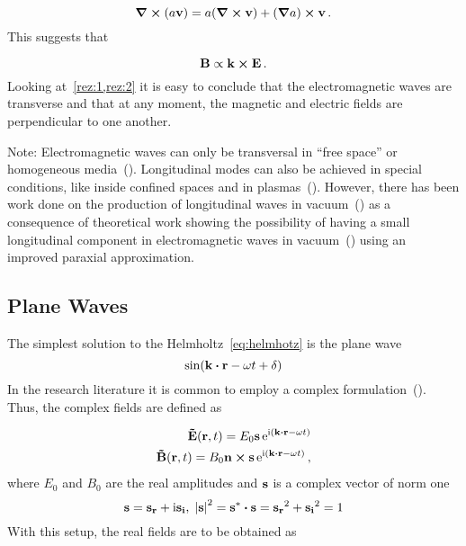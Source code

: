 \documentclass[12pt, class=report, crop=false]{standalone}
\begin{document}
\begin{equation}
  \label{id:curl-scalar*vector}
  \curl{(a\vb{v})} = a (\curl{\vb{v}}) + (\grad{a})\cp\vb{v}\,.
\end{equation}
This suggests that

\begin{equation}
  \label{rez:2}
  \vb{B} \propto \vb{k}\cp\vb{E} \,.
\end{equation}
Looking at~\cref{rez:1,rez:2} it is easy to conclude that the electromagnetic waves are transverse and that at any moment, the magnetic and electric fields are perpendicular to one another.

\par
Note: Electromagnetic waves can only be transversal in ``free space'' or homogeneous media~(\cite{heavisideElectromagneticTheoryIncluding1971}). Longitudinal modes can also be achieved in special conditions, like inside confined spaces and in plasmas~(\cite{jacksonClassicalElectrodynamics1999,griffithsIntroductionElectrodynamics1999}). However, there has been work done on the production of longitudinal waves in vacuum~(\cite{wangCreationNeedleLongitudinally2008}) as a consequence of theoretical work showing the possibility of having a small longitudinal component in electromagnetic waves in vacuum~(\cite{cicchitelliLongitudinalFieldComponents1990}) using an improved paraxial approximation.

\subsection{Plane Waves}

The simplest solution to the Helmholtz~\cref{eq:helmhotz} is the plane wave
\begin{equation}
  \sin(\vb{k}\vdot\vb{r} - \omega t + \delta)
\end{equation}
In the research literature it is common to employ a complex formulation~(\cite{vrejoiuElectrodinamicaSiTeoria1987}). Thus, the complex fields are defined as

\begin{subequations}
  \begin{align}
    \label{def:complex-field}
    \vb{\tilde{E}}(\vb{r},t) = E_0 \vb{s} \ee^{\ii (\vb{k}\vdot\vb{r} - \omega t)} \\
    \vb{\tilde{B}}(\vb{r},t) = B_0 \vb{n}\cp\vb{s} \ee^{\ii (\vb{k}\vdot\vb{r} - \omega t)} \,,
  \end{align}
\end{subequations}
where \(E_0\) and \(B_0\) are the real amplitudes and \(\vb{s}\) is a complex vector of norm one
\begin{equation*}
  \vb{s} = \vb{s_r} + \ii \vb{s_i}, \; \abs{\vb{s}}^2 = \vb{s^*}\vdot\vb{s} = \vb{s_r}^{2} + \vb{s_i}^{2} =1
\end{equation*}
With this setup, the real fields are to be obtained as
\end{document}
